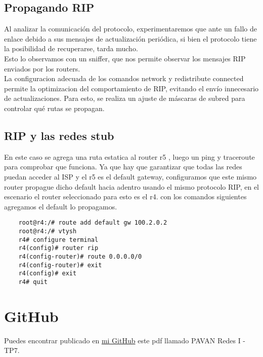 \documentclass{article}
\begin{document}
\subsection{Propagando RIP}
Al analizar la comunicación del protocolo, experimentaremos que ante un fallo de enlace debido a sus mensajes de actualización periódica, si bien el protocolo tiene la posibilidad de recuperarse, tarda mucho.
\\
Esto lo observamos con un sniffer, que nos permite observar los mensajes RIP enviados por los routers.
\\
La configuracion adecuada de los comandos network y redistribute connected permite la optimizacion del comportamiento de RIP, evitando el envío innecesario de actualizaciones. Para esto, se realiza un ajuste de máscaras de subred para controlar qué rutas se propagan.

\subsection{RIP y las redes stub}
En este caso se agrega una ruta estatica al router r5 , luego un ping y traceroute para comprobar que funciona. Ya que hay que garantizar que todas las redes puedan acceder al ISP y el r5 es el default gateway, configuramos que este mismo router propague dicho default hacia adentro usando el mismo protocolo RIP, en el escenario el router seleccionado para esto es el r4.
con los comandos siguientes agregamos el default lo propagamos.
\begin{lstlisting}
    root@r4:/# route add default gw 100.2.0.2
    root@r4:/# vtysh
    r4# configure terminal
    r4(config)# router rip
    r4(config-router)# route 0.0.0.0/0
    r4(config-router)# exit
    r4(config)# exit
    r4# quit
\end{lstlisting}


\section{GitHub}
Puedes encontrar publicado en \href{https://github.com/martinpavan1/redes1}{mi GitHub} este pdf llamado PAVAN Redes I - TP7.
\end{document}

